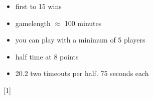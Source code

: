 \small{
    \begin{itemize}
        \item first to 15 wins
        \item gamelength $\approx$ 100 minutes
        \item you can play with a minimum of 5 players
        \item half time at 8 points
        \item 20.2 two timeouts per half. 75 seconds each
    \end{itemize}
}


\begin{center}[1]\end{center}
